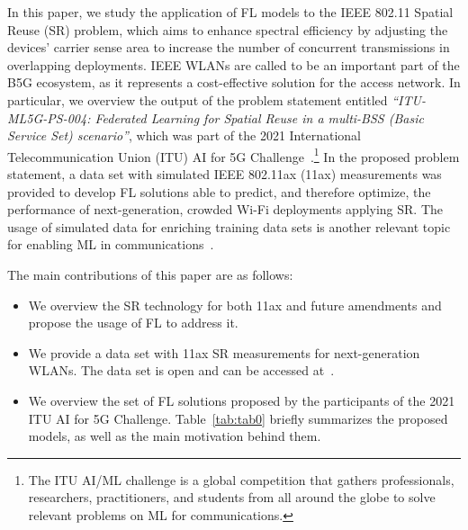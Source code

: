 \documentclass[10pt,a4paper,twocolumn]{article}
\newcommand{\ITUpar}{\vspace{8pt}\par}
\begin{document}
In this paper, we study the application of FL models to the IEEE 802.11 Spatial Reuse (SR) problem, which aims to enhance spectral efficiency by adjusting the devices' carrier sense area to increase the number of concurrent transmissions in overlapping deployments. IEEE WLANs are called to be an important part of the B5G ecosystem, as it represents a cost-effective solution for the access network. In particular, we overview the output of the problem statement entitled \textit{``ITU-ML5G-PS-004: Federated Learning for Spatial Reuse in a multi-BSS (Basic Service Set) scenario''}, which was part of the 2021 International Telecommunication Union (ITU) AI for 5G Challenge~\cite{bib2}.\footnote{The ITU AI/ML challenge is a global competition that gathers professionals, researchers, practitioners, and students from all around the globe to solve relevant problems on ML for communications.} In the proposed problem statement, a data set with simulated IEEE 802.11ax (11ax) measurements was provided to develop FL solutions able to predict, and therefore optimize, the performance of next-generation, crowded Wi-Fi deployments applying SR. The usage of simulated data for enriching training data sets is another relevant topic for enabling ML in communications~\cite{wilhelmi2021usage}.\ITUpar

The main contributions of this paper are as follows:
\begin{itemize}
	\item We overview the SR technology for both 11ax and future amendments and propose the usage of FL to address it.
	\item We provide a data set with 11ax SR measurements for next-generation WLANs. The data set is open and can be accessed at~\cite{dataset}. 
	\item We overview the set of FL solutions proposed by the participants of the 2021 ITU AI for 5G Challenge. Table~\ref{tab:tab0} briefly summarizes the proposed models, as well as the main motivation behind them.
\end{itemize}\ITUpar
\end{document}
